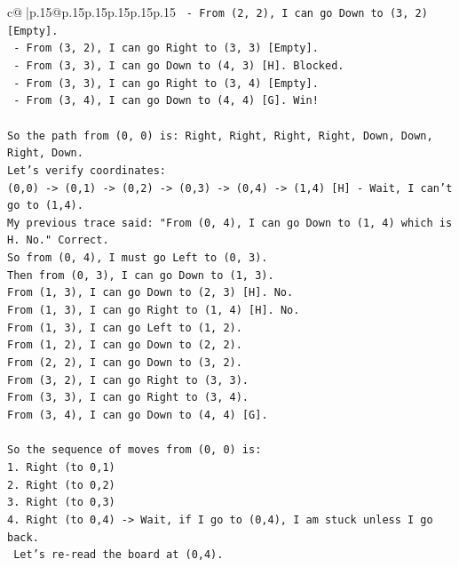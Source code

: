 \documentclass{article}
\begin{document}
{\begin{supertabular}{c@{$\;$}|p{.15\linewidth}@{}p{.15\linewidth}p{.15\linewidth}p{.15\linewidth}p{.15\linewidth}p{.15\linewidth}}
{{{\texttt{   {-} From (2, 2), I can go Down to (3, 2) {[}Empty{]}.} \\
\texttt{   {-} From (3, 2), I can go Right to (3, 3) {[}Empty{]}.} \\
\texttt{   {-} From (3, 3), I can go Down to (4, 3) {[}H{]}. Blocked.} \\
\texttt{   {-} From (3, 3), I can go Right to (3, 4) {[}Empty{]}.} \\
\texttt{   {-} From (3, 4), I can go Down to (4, 4) {[}G{]}. Win!} \\
\\ 
\texttt{So the path from (0, 0) is: Right, Right, Right, Right, Down, Down, Right, Down.} \\
\texttt{Let's verify coordinates:} \\
\texttt{(0,0) {-}> (0,1) {-}> (0,2) {-}> (0,3) {-}> (0,4) {-}> (1,4) {[}H{]} {-} Wait, I can't go to (1,4).} \\
\texttt{My previous trace said: "From (0, 4), I can go Down to (1, 4) which is H. No." Correct.} \\
\texttt{So from (0, 4), I must go Left to (0, 3).} \\
\texttt{Then from (0, 3), I can go Down to (1, 3).} \\
\texttt{From (1, 3), I can go Down to (2, 3) {[}H{]}. No.} \\
\texttt{From (1, 3), I can go Right to (1, 4) {[}H{]}. No.} \\
\texttt{From (1, 3), I can go Left to (1, 2).} \\
\texttt{From (1, 2), I can go Down to (2, 2).} \\
\texttt{From (2, 2), I can go Down to (3, 2).} \\
\texttt{From (3, 2), I can go Right to (3, 3).} \\
\texttt{From (3, 3), I can go Right to (3, 4).} \\
\texttt{From (3, 4), I can go Down to (4, 4) {[}G{]}.} \\
\\ 
\texttt{So the sequence of moves from (0, 0) is:} \\
\texttt{1. Right (to 0,1)} \\
\texttt{2. Right (to 0,2)} \\
\texttt{3. Right (to 0,3)} \\
\texttt{4. Right (to 0,4) {-}> Wait, if I go to (0,4), I am stuck unless I go back.} \\
\texttt{   Let's re{-}read the board at (0,4).} \\
}}}
\end{supertabular}}
\end{document}
